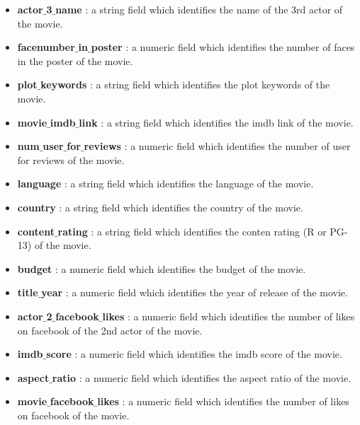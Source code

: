 \documentclass[conference]{IEEEtran}
\begin{document}
\begin{itemize}
    \item \textbf{actor$\_$3$\_$name} : a string field which identifies the name of the 3rd actor of the movie.
    \item \textbf{facenumber$\_$in$\_$poster} : a numeric field which identifies the number of faces in the poster of the movie.
    \item \textbf{plot$\_$keywords}  : a string field which identifies the plot keywords of the movie.
    \item \textbf{movie$\_$imdb$\_$link} : a string field which identifies the imdb link of the movie. 
    \item \textbf{num$\_$user$\_$for$\_$reviews} : a numeric field which identifies the number of user for reviews of the movie. 
    \item \textbf{language}  : a string field which identifies the language of the movie.
    \item \textbf{country}  : a string field which identifies the country of the movie.
    \item \textbf{content$\_$rating} : a string field which identifies the conten rating (R or PG-13) of the movie.
    \item \textbf{budget} : a numeric field which identifies the budget of the movie.
    \item \textbf{title$\_$year} : a numeric field which identifies the year of release of the movie. 
    \item \textbf{actor$\_$2$\_$facebook$\_$likes} : a numeric field which identifies the number of likes on facebook of the 2nd actor of the movie.
    \item \textbf{imdb$\_$score} : a numeric field which identifies the imdb score of the movie.
    \item \textbf{aspect$\_$ratio}  : a numeric field which identifies the aspect ratio of the movie. 
    \item \textbf{movie$\_$facebook$\_$likes}  : a numeric field which identifies the number of likes on facebook of the movie.\\
\end{itemize}
\end{document}
